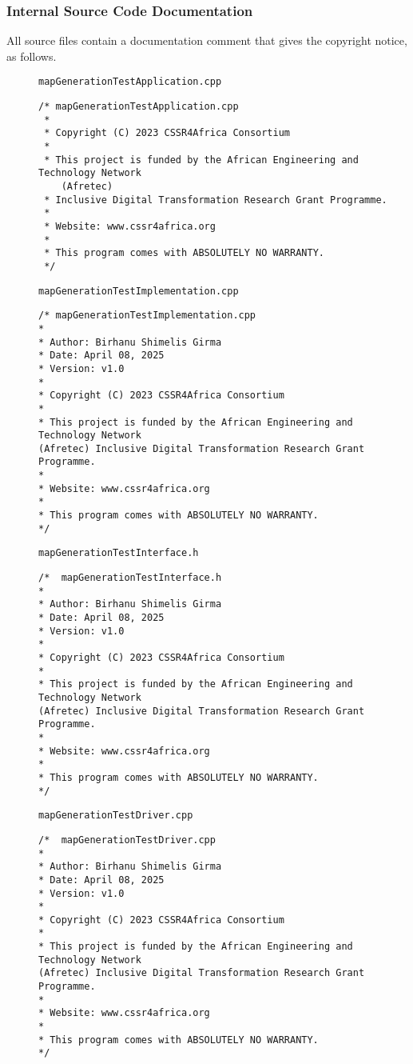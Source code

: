 \documentclass{CSSRforAfrica}
\newcommand{\checkboxChecked}{\fbox{\ding{51}}} %
\begin{document}
\subsubsection{Internal Source Code Documentation}
\label{subsubsection:map_generation_test_documentation_standards}  

\noindent All source files contain a documentation comment that gives the copyright notice, as follows.
 
\begin{description}

\item[\checkboxChecked] {\small \verb+mapGenerationTestApplication.cpp+}  
{\small \begin{verbatim}
/* mapGenerationTestApplication.cpp
 * 
 * Copyright (C) 2023 CSSR4Africa Consortium
 * 
 * This project is funded by the African Engineering and Technology Network 
    (Afretec) 
 * Inclusive Digital Transformation Research Grant Programme. 
 *
 * Website: www.cssr4africa.org
 *
 * This program comes with ABSOLUTELY NO WARRANTY.
 */
\end{verbatim} }

\item[\checkboxChecked]  {\small \verb+mapGenerationTestImplementation.cpp+}  
{\small \begin{verbatim}
/* mapGenerationTestImplementation.cpp
*
* Author: Birhanu Shimelis Girma
* Date: April 08, 2025
* Version: v1.0
*
* Copyright (C) 2023 CSSR4Africa Consortium
*
* This project is funded by the African Engineering and Technology Network 
(Afretec) Inclusive Digital Transformation Research Grant Programme.
*
* Website: www.cssr4africa.org
*
* This program comes with ABSOLUTELY NO WARRANTY.
*/
\end{verbatim} }

\item[\checkboxChecked] {\small \verb+mapGenerationTestInterface.h+}   
{\small \begin{verbatim}
/*  mapGenerationTestInterface.h
*
* Author: Birhanu Shimelis Girma
* Date: April 08, 2025
* Version: v1.0
*
* Copyright (C) 2023 CSSR4Africa Consortium
*
* This project is funded by the African Engineering and Technology Network 
(Afretec) Inclusive Digital Transformation Research Grant Programme.
*
* Website: www.cssr4africa.org
*
* This program comes with ABSOLUTELY NO WARRANTY.
*/
\end{verbatim} }

\item[\checkboxChecked] {\small \verb+mapGenerationTestDriver.cpp+}  
{\small \begin{verbatim}
/*  mapGenerationTestDriver.cpp
*
* Author: Birhanu Shimelis Girma
* Date: April 08, 2025
* Version: v1.0
*
* Copyright (C) 2023 CSSR4Africa Consortium
*
* This project is funded by the African Engineering and Technology Network 
(Afretec) Inclusive Digital Transformation Research Grant Programme.
*
* Website: www.cssr4africa.org
*
* This program comes with ABSOLUTELY NO WARRANTY.
*/
\end{verbatim} }


\end{description} 
\end{document}
